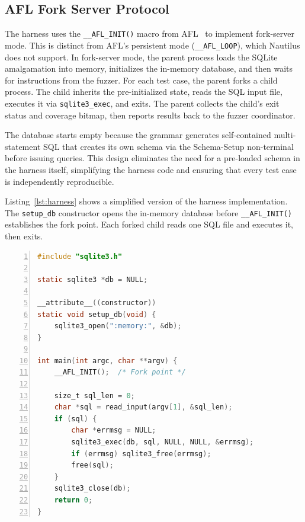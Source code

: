 \subsection{AFL Fork Server Protocol}

The harness uses the \texttt{\_\_AFL\_INIT()} macro from AFL~\cite{afl} to implement fork-server mode. This is distinct from AFL's persistent mode (\texttt{\_\_AFL\_LOOP}), which Nautilus does not support. In fork-server mode, the parent process loads the SQLite amalgamation into memory, initializes the in-memory database, and then waits for instructions from the fuzzer. For each test case, the parent forks a child process. The child inherits the pre-initialized state, reads the SQL input file, executes it via \texttt{sqlite3\_exec}, and exits. The parent collects the child's exit status and coverage bitmap, then reports results back to the fuzzer coordinator.

The database starts empty because the grammar generates self-contained multi-statement SQL that creates its own schema via the Schema-Setup non-terminal before issuing queries. This design eliminates the need for a pre-loaded schema in the harness itself, simplifying the harness code and ensuring that every test case is independently reproducible.

Listing~\ref{lst:harness} shows a simplified version of the harness implementation. The \texttt{setup\_db} constructor opens the in-memory database before \texttt{\_\_AFL\_INIT()} establishes the fork point. Each forked child reads one SQL file and executes it, then exits.

\begin{lstlisting}[language=C, caption={Simplified SQLite harness for AFL fork-server mode. The database is opened before the fork point; each child executes one SQL input.}, label=lst:harness, basicstyle=\ttfamily\small, numbers=left]
#include "sqlite3.h"

static sqlite3 *db = NULL;

__attribute__((constructor))
static void setup_db(void) {
    sqlite3_open(":memory:", &db);
}

int main(int argc, char **argv) {
    __AFL_INIT();  /* Fork point */

    size_t sql_len = 0;
    char *sql = read_input(argv[1], &sql_len);
    if (sql) {
        char *errmsg = NULL;
        sqlite3_exec(db, sql, NULL, NULL, &errmsg);
        if (errmsg) sqlite3_free(errmsg);
        free(sql);
    }
    sqlite3_close(db);
    return 0;
}
\end{lstlisting}

